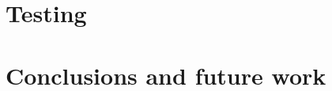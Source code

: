 \documentclass[a4paper,twoside,12pt]{book}
\renewcommand{\chaptermark}[1]{\markboth{#1}{#1}}
\begin{document}
    

\chapter{Testing}

    

\chapter{Conclusions and future work}

    
    
    
%
    

\clearpage  %
\printbibliography

\newpage %
\appendix %


\end{document}
